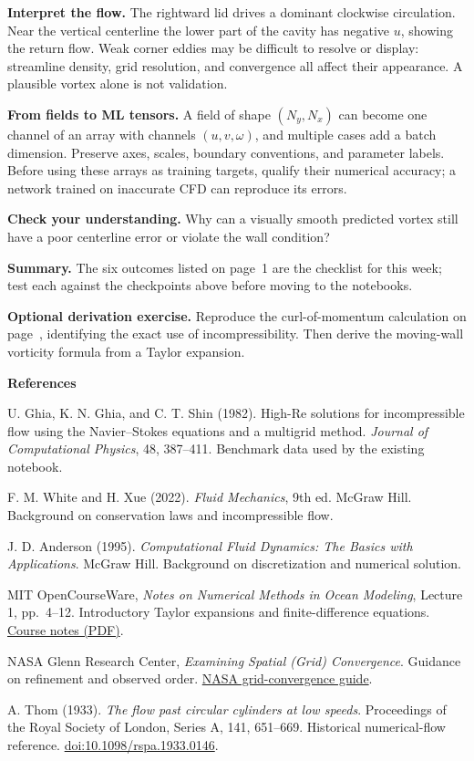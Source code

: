 \documentclass[11pt]{article}
\newcommand{\checkpoint}[1]{\par\smallskip\noindent\textcolor{accent}{\textbf{Check your understanding.}} #1\par}
\begin{document}
\textbf{Interpret the flow.} The rightward lid drives a dominant clockwise circulation. Near the vertical centerline the lower part of the cavity has negative $u$, showing the return flow. Weak corner eddies may be difficult to resolve or display: streamline density, grid resolution, and convergence all affect their appearance. A plausible vortex alone is not validation.

\textbf{From fields to ML tensors.} A field of shape $(N_y,N_x)$ can become one channel of an array with channels $(u,v,\omega)$, and multiple cases add a batch dimension. Preserve axes, scales, boundary conventions, and parameter labels. Before using these arrays as training targets, qualify their numerical accuracy; a network trained on inaccurate CFD can reproduce its errors.
\checkpoint{Why can a visually smooth predicted vortex still have a poor centerline error or violate the wall condition?}
\newpage

\newpage
\textbf{Summary.} The six outcomes listed on page~1 are the checklist for this week; test each against the checkpoints above before moving to the notebooks.

\textbf{Optional derivation exercise.} Reproduce the curl-of-momentum calculation on page~\pageref{sec:transport}, identifying the exact use of incompressibility. Then derive the moving-wall vorticity formula from a Taylor expansion.

\textbf{References}
\begin{enumerate}[label={[\arabic*]}]
\item U. Ghia, K. N. Ghia, and C. T. Shin (1982). High-Re solutions for incompressible flow using the Navier--Stokes equations and a multigrid method. \emph{Journal of Computational Physics}, 48, 387--411. Benchmark data used by the existing notebook.
\item F. M. White and H. Xue (2022). \emph{Fluid Mechanics}, 9th ed. McGraw Hill. Background on conservation laws and incompressible flow.
\item J. D. Anderson (1995). \emph{Computational Fluid Dynamics: The Basics with Applications}. McGraw Hill. Background on discretization and numerical solution.
\item MIT OpenCourseWare, \emph{Notes on Numerical Methods in Ocean Modeling}, Lecture 1, pp.~4--12. Introductory Taylor expansions and finite-difference equations. \href{https://ocw.mit.edu/courses/12-950-atmospheric-and-oceanic-modeling-spring-2004/507424ba4dc53db72128cae0d5231e80_lec1.pdf}{Course notes (PDF)}.
\item NASA Glenn Research Center, \emph{Examining Spatial (Grid) Convergence}. Guidance on refinement and observed order. \href{https://www.grc.nasa.gov/www/wind/valid/tutorial/spatconv.html}{NASA grid-convergence guide}.
\item A. Thom (1933). \emph{The flow past circular cylinders at low speeds}. Proceedings of the Royal Society of London, Series A, 141, 651--669. Historical numerical-flow reference. \href{https://doi.org/10.1098/rspa.1933.0146}{doi:10.1098/rspa.1933.0146}.
\end{enumerate}

\end{document}
